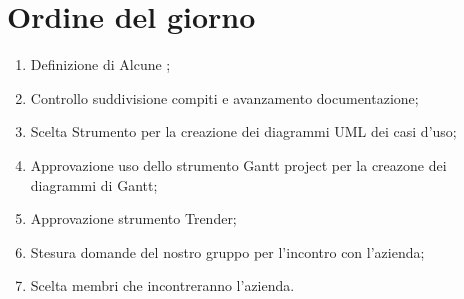 \documentclass[../verbale-2016-12-14.tex]{subfiles}
\begin{document}
	
\section{Ordine del giorno}
	\begin{enumerate}
		\item Definizione di Alcune \normediprogetto;
		\item Controllo suddivisione compiti e avanzamento documentazione;
		\item Scelta Strumento per la creazione dei diagrammi UML dei casi d’uso;
		\item Approvazione uso dello strumento Gantt project per la creazone dei diagrammi di Gantt;
		\item Approvazione strumento Trender;
		\item Stesura domande del nostro gruppo per l’incontro con l’azienda;
		\item Scelta membri che incontreranno l’azienda.
	\end{enumerate}
	
\end{document}
